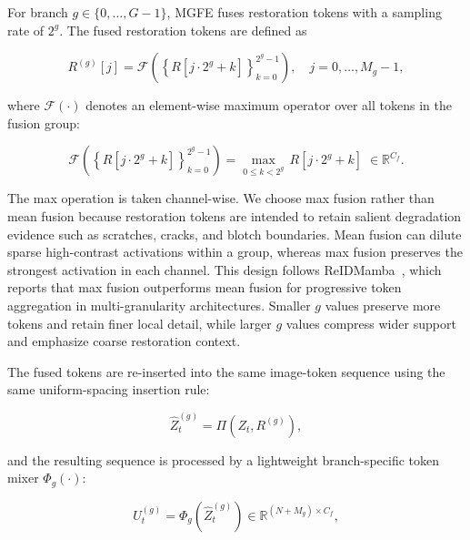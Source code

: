 \documentclass[symmetry,article,submit,pdftex,moreauthors]{Definitions/mdpi}
\begin{document}
For branch $g \in \{0,\ldots,G-1\}$, MGFE fuses restoration tokens with a sampling rate of $2^g$. The fused restoration tokens are defined as

\begin{equation}
R^{(g)}[j] =
\mathcal{F}\!\left(
\left\{R[j{\cdot}2^g+k]\right\}_{k=0}^{2^g-1}
\right),\quad
j = 0,\ldots,M_g-1,
\end{equation}

where $\mathcal{F}(\cdot)$ denotes an element-wise maximum operator over all tokens in the fusion group:

\begin{equation}
\mathcal{F}\!\left(
\left\{R[j\cdot2^g+k]\right\}_{k=0}^{2^g-1}
\right)
= \max_{0\le k < 2^g}\,R[j\cdot2^g+k]\;\in\mathbb{R}^{C_f}.
\label{eq:max_fusion}
\end{equation}

The max operation is taken channel-wise. We choose max fusion rather than mean fusion because restoration tokens are intended to retain salient degradation evidence such as scratches, cracks, and blotch boundaries. Mean fusion can dilute sparse high-contrast activations within a group, whereas max fusion preserves the strongest activation in each channel. This design follows ReIDMamba~\cite{gu2025reidmamba}, which reports that max fusion outperforms mean fusion for progressive token aggregation in multi-granularity architectures. Smaller $g$ values preserve more tokens and retain finer local detail, while larger $g$ values compress wider support and emphasize coarse restoration context.

The fused tokens are re-inserted into the same image-token sequence using the same uniform-spacing insertion rule:

\begin{equation}
\widehat{Z}_t^{(g)} = \Pi\!\left(Z_t,R^{(g)}\right),
\end{equation}

and the resulting sequence is processed by a lightweight branch-specific token mixer $\Phi_g(\cdot)$:

\begin{equation}
U_t^{(g)} = \Phi_g\!\left(\widehat{Z}_t^{(g)}\right)
\in \mathbb{R}^{(N+M_g)\times C_f},
\end{equation}
\end{document}
